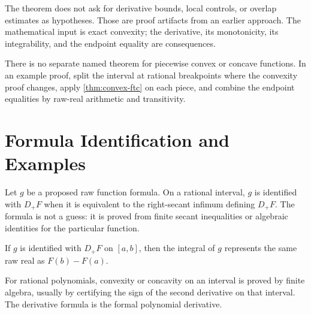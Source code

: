 \begin{remark}\label{rem:no-effective-side-conditions}
The theorem does not ask for derivative bounds, local controls, or overlap
estimates as hypotheses.  Those are proof artifacts from an earlier approach.
The mathematical input is exact convexity; the derivative, its monotonicity,
its integrability, and the endpoint equality are consequences.
\end{remark}

\begin{remark}\label{rem:no-piecewise-ftc}
There is no separate named theorem for piecewise convex or concave functions.
In an example proof, split the interval at rational breakpoints where the
convexity proof changes, apply \cref{thm:convex-ftc} on each piece, and
combine the endpoint equalities by raw-real arithmetic and transitivity.
\end{remark}

\section{Formula Identification and Examples}

\begin{definition}\label{def:formula-identification}
Let \(g\) be a proposed raw function formula.  On a rational interval,
\(g\) is identified with \(D_+F\) when it is equivalent to the right-secant
infimum defining \(D_+F\).  The formula is not a guess: it is proved from
finite secant inequalities or algebraic identities for the particular
function.
\end{definition}

\begin{theorem}
\label{thm:formula-identification-ftc}
If \(g\) is identified with \(D_+F\) on \([a,b]\), then
the integral of \(g\) represents the same raw real as \(F(b)-F(a)\).
\end{theorem}

\begin{example}[Polynomials]\label{ex:polynomial-ftc}
For rational polynomials, convexity or concavity on an interval is proved by
finite algebra, usually by certifying the sign of the second derivative on
that interval.  The derivative formula is the formal polynomial derivative.
\end{example}

